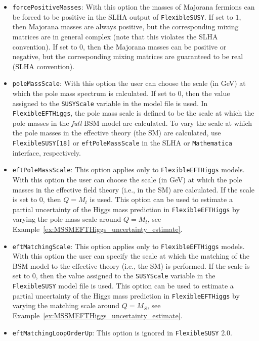 \documentclass[final,3p,11pt,pdflatex]{elsarticle}
\makeatletter
\newcommand{\fs}{\texttt{FlexibleSUSY}\@\xspace}
\newcommand{\fstwo}{\fs 2.0\@\xspace}
\newcommand{\feft}{\texttt{Flex\-ib\-le\-EFT\-Higgs}\@\xspace}
\newcommand{\mathematica}{\texttt{Ma\-the\-ma\-ti\-ca}\xspace}
\newcommand{\code}[1]{\lstinline|#1|}  %
\newcommand{\BSM}{\ensuremath{\text{BSM}}\xspace}
\newcommand{\MS}{\ensuremath{M_S}\xspace}
\newcommand{\exref}[1]{Example~\ref{#1}}
\makeatother
\begin{document}
\begin{itemize}
\item[\texttt{FlexibleSUSY[16]},] \texttt{forcePositiveMasses}: With
  this option the masses of Majorana fermions can be forced to be
  positive in the SLHA output of \fs.  If set to $1$, then Majorana
  masses are always positive, but the corresponding mixing matrices
  are in general complex (note that this violates the SLHA
  convention).  If set to $0$, then the Majorana masses can be
  positive or negative, but the corresponding mixing matrices are
  guaranteed to be real (SLHA convention).

\item[\texttt{FlexibleSUSY[17]},] \texttt{poleMassScale}: With this
  option the user can choose the scale (in GeV) at which the pole mass
  spectrum is calculated.  If set to $0$, then the value assigned to
  the \code{SUSYScale} variable in the model file is used.  In \feft,
  the pole mass scale is defined to be the scale at which the pole
  masses in the \emph{full} \BSM model are calculated.  To vary the
  scale at which the pole masses in the effective theory (the
  SM) are calculated, use \texttt{FlexibleSUSY[18]} or
  \texttt{eftPoleMassScale} in the SLHA or \mathematica interface,
  respectively.

\item[\texttt{FlexibleSUSY[18]},] \texttt{eftPoleMassScale}: This
  option applies only to \feft models.  With this option the user can
  choose the scale (in GeV) at which the pole masses in the effective
  field theory (i.e., in the SM) are calculated.  If the
  scale is set to $0$, then $Q = M_t$ is used.  This option can be
  used to estimate a partial uncertainty of the Higgs mass
  prediction in \feft by varying the pole mass scale around $Q = M_t$,
  see \exref{ex:MSSMEFTHiggs_uncertainty_estimate}.

\item[\texttt{FlexibleSUSY[19]},] \texttt{eftMatchingScale}: This
  option applies only to \feft models.  With this option the user can
  specify the scale at which the matching of the \BSM model to the
  effective theory (i.e., the SM) is performed.  If the
  scale is set to $0$, then the value assigned to the \code{SUSYScale}
  variable in the \fs model file is used.  This option can be used to
  estimate a partial uncertainty of the Higgs mass prediction
  in \feft by varying the matching scale around $Q = \MS$, see
  \exref{ex:MSSMEFTHiggs_uncertainty_estimate}.

\item[\texttt{FlexibleSUSY[20]},] \texttt{eftMatchingLoopOrderUp}:
  This option is ignored in \fstwo.


\end{itemize}
\end{document}
